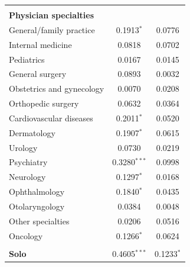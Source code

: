 \documentclass[12pt]{report}
\begin{document}
{\begin{center}
\begin{longtable}{lcc}
                                       &                          &                           \\
\textbf{Physician specialties}         &                          &                           \\
General/family practice                & 0.1913$^{*}$               & 0.0776                    \\
Internal medicine                      & 0.0818                   & 0.0702                    \\
Pediatrics                             & 0.0167                   & 0.0145                    \\
General surgery                        & 0.0893                   & 0.0032                    \\
Obstetrics and gynecology              & 0.0070                   & 0.0208                    \\
Orthopedic surgery                     & 0.0632                   & 0.0364                    \\
Cardiovascular diseases                & 0.2011$^{*}$               & 0.0520                    \\
Dermatology                            & 0.1907$^{*}$               & 0.0615                    \\
Urology                                & 0.0730                   & 0.0219                    \\
Psychiatry                             & 0.3280$^{***}$               & 0.0998                    \\
Neurology                              & 0.1297$^{*}$               & 0.0168                    \\
Ophthalmology                          & 0.1840$^{*}$               & 0.0435                    \\
Otolaryngology                         & 0.0384                   & 0.0048                    \\
Other specialties                      & 0.0206                   & 0.0516                    \\
Oncology                               & 0.1266$^{*}$               & 0.0624                    \\
                                       &                          &                           \\
\textbf{Solo}                                   & 0.4605$^{***}$               & 0.1233$^{*}$                \\

\end{longtable}
\end{center}}
\end{document}
